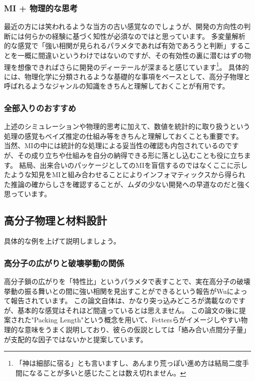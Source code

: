 \documentclass[a4paper,11pt]{jlreq}
\begin{document}
\subsubsection{MI + 物理的な思考}
最近の方には笑われるような当方の古い感覚なのでしょうが、開発の方向性の判断には何らかの経験に基づく知性が必須なのではと思っています。
多変量解析的な感覚で「強い相関が見られるパラメタであれば有効であろうと判断」することを一概に間違いというわけではないのですが、その有効性の裏に潜むはずの物理を想像できればさらに開発のディーテールが深まると感じています\footnote{
    「神は細部に宿る」とも言いますし、あんまり荒っぽい進め方は結局二度手間になることが多いと感じたことは数え切れません。
}。
具体的には、物理化学に分類されるような基礎的な事項をベースとして、高分子物理と呼ばれるようなジャンルの知識をきちんと理解しておくことが有用です。

\subsubsection{全部入りのおすすめ}
上述のシミュレーションや物理的思考に加えて、数値を統計的に取り扱うという処理の感覚もベイズ推定の仕組み等をきちんと理解しておくことも重要です。
当然、MIの中には統計的な処理による妥当性の確認も内包されているのですが、その成り立ちや仕組みを自分の納得できる形に落とし込むことも役に立ちます。
結局、出来合いのパッケージとしてのMIを盲信するのではなくここに示したような知見をMIと組み合わせることによりインフォマティックスから得られた推論の確からしさを確認することが、ムダの少ない開発への早道なのだと強く思っています。

\subsection{高分子物理と材料設計}
具体的な例を上げて説明しましょう。

\subsubsection{高分子の広がりと破壊挙動の関係}
高分子鎖の広がりを「特性比」というパラメタで表すことで、実在高分子の破壊挙動の振る舞いとの間に強い相関を見出すことができるという報告がWuによって報告されています。
この論文自体は、かなり突っ込みどころが満載なのですが、基本的な感覚はそれほど間違っているとは思えません。
この論文の後に提案された"Packing Length"という概念を用いて、Fettersらがイメージしやすい物理的な意味をうまく説明しており、彼らの仮説としては「絡み合い点間分子量」が支配的な因子ではないかと提案しています。
\end{document}
